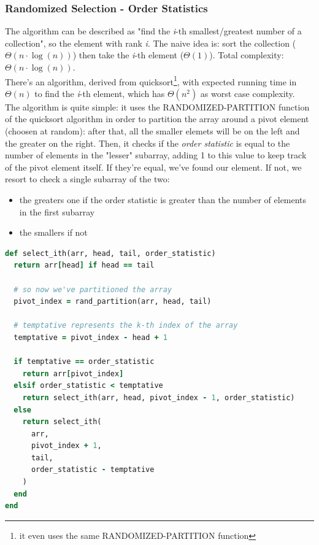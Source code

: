 \documentclass{article}
\begin{document}
			\subsubsection{Randomized Selection - Order Statistics}
				The algorithm can be described as "find the \emph{i}-th smallest/greatest number of a collection", so the element with rank \emph{i}. The naive idea is: sort the collection ($\Theta(n \cdot \log(n))$) then take the \emph{i}-th element ($\Theta(1)$). Total complexity: $\Theta(n \cdot \log(n))$.\\
				There's an algorithm, derived from quicksort\footnote{it even uses the same RANDOMIZED-PARTITION function}, with expected running time in $\Theta(n)$ to find the \emph{i}-th element, which has $\Theta(n^2)$ as worst case complexity.\\
				The algorithm is quite simple: it uses the RANDOMIZED-PARTITION function of the quicksort algorithm in order to partition the array around a pivot element (choosen at random): after that, all the smaller elemets will be on the left and the greater on the right. Then, it checks if the \textit{order statistic} is equal to the number of elements in the "lesser" subarray, adding 1 to this value to keep track of the pivot element itself. If they're equal, we've found our element. If not, we resort to check a single subarray of the two:
				\begin{itemize}
					\item the greaters one if the order statistic is greater than the number of elements in the first subarray
					\item the smallers if not
				\end{itemize}
				\begin{lstlisting}[language=Ruby]
def select_ith(arr, head, tail, order_statistic)                                                                                                                       
  return arr[head] if head == tail
  
  # so now we've partitioned the array
  pivot_index = rand_partition(arr, head, tail)

  # temptative represents the k-th index of the array
  temptative = pivot_index - head + 1 

  if temptative == order_statistic
    return arr[pivot_index]
  elsif order_statistic < temptative
    return select_ith(arr, head, pivot_index - 1, order_statistic)
  else
    return select_ith(
      arr, 
      pivot_index + 1, 
      tail, 
      order_statistic - temptative
    )
  end
end
				\end{lstlisting}
\end{document}

